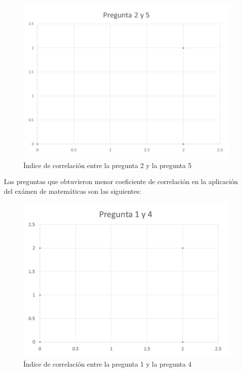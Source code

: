 \documentclass[12pt] {report}
\begin{document}
\begin{figure}[H]
\centering 
\includegraphics[scale=.7]{MCorrelacionmax25.JPG}
\caption{Índice de correlación entre la pregunta 2 y la pregunta 5}
\end{figure}
Las preguntas que obtuvieron menor coeficiente de correlación en la aplicación del exámen de matemáticas son las siguientes:
\begin{figure}[H]
\centering 
\includegraphics[scale=.7]{MCorrelacionmin14.JPG}
\caption{Índice de correlación entre la pregunta 1 y la pregunta 4}
\end{figure}
\end{document}
